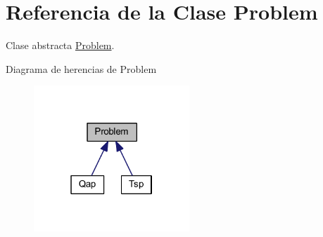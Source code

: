 \hypertarget{class_problem}{\section{Referencia de la Clase Problem}
\label{class_problem}
}


Clase abstracta \hyperlink{class_problem}{Problem}.  




Diagrama de herencias de Problem
\nopagebreak
\begin{figure}[H]
\begin{center}
\leavevmode
\includegraphics[width=166pt]{class_problem__inherit__graph}
\end{center}
\end{figure}

